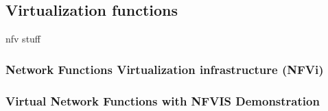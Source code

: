 \subsection{Virtualization functions}
nfv stuff

\subsubsection{Network Functions Virtualization infrastructure (NFVi)}
\subsubsection{Virtual Network Functions with NFVIS Demonstration}
